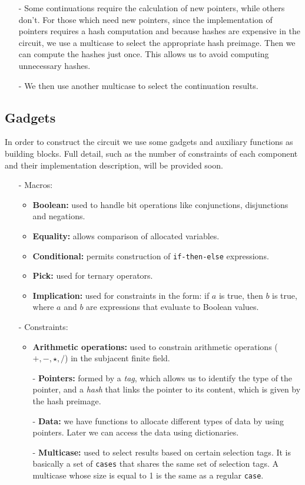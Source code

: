 \documentclass[10pt, english]{article}
\begin{document}
\begin{itemize}
  \item[-] Some continuations require the calculation of new pointers, while others don't. For those which need new pointers, since the implementation of pointers requires a hash computation and because hashes are expensive in the circuit, we use a multicase to select the appropriate hash preimage. Then we can compute the hashes just once. This allows us to avoid computing unnecessary hashes.
	\item[-] We then use another multicase to select the continuation results.
\end{itemize}

\subsection{Gadgets}

In order to construct the circuit we use some gadgets and auxiliary functions as building blocks. Full detail, such as the number of constraints of each component and their implementation description, will be provided soon.

\begin{itemize}
	\item[-] Macros:
	\begin{itemize}
		\item \textbf{Boolean:} used to handle bit operations like conjunctions, disjunctions and negations.
    \item \textbf{Equality:} allows comparison of allocated variables.
		\item \textbf{Conditional:} permits construction of \verb|if-then-else| expressions.
		\item \textbf{Pick:} used for ternary operators.
		\item \textbf{Implication:} used for constraints in the form: if $a$ is true, then $b$ is true, where $a$ and $b$ are expressions that evaluate to Boolean values.
	\end{itemize}
	\item[-] Constraints:
	\begin{itemize}
    \item \textbf{Arithmetic operations:} used to constrain arithmetic operations ($+, -, \star, \slash$) in the subjacent finite field.
	  \item[-] \textbf{Pointers:} formed by a \emph{tag}, which allows us to identify the type of the pointer, and a \emph{hash} that links the pointer to its content, which is given by the hash preimage.
    \item[-] \textbf{Data:} we have functions to allocate different types of data by using pointers. Later we can access the data using dictionaries.
    \item[-] \textbf{Multicase:} used to select results based on certain selection tags. It is basically a set of \verb|cases| that shares the same set of selection tags. A multicase whose size is equal to 1 is the same as a regular \verb|case|.
  \end{itemize}
\end{itemize}
\end{document}
